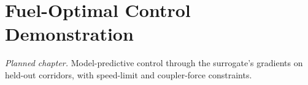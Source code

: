\chapter{Fuel-Optimal Control Demonstration}
\label{ch:control}


\emph{Planned chapter.} Model-predictive control through the surrogate's gradients on held-out corridors, with speed-limit and coupler-force constraints.
